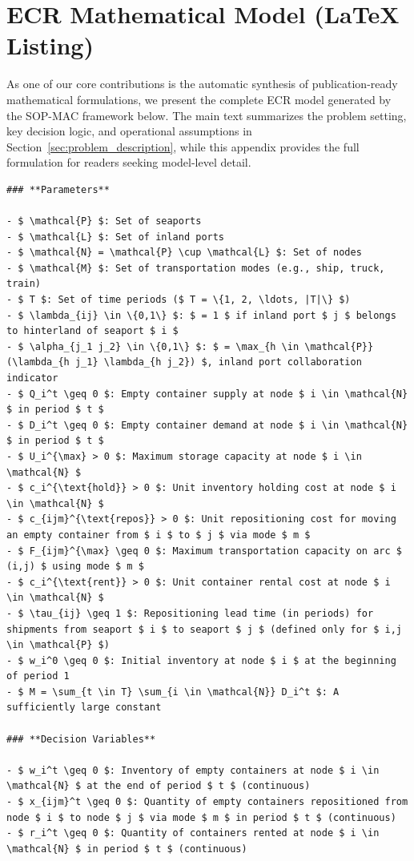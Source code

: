\documentclass[preprint,12pt]{elsarticle}
\begin{document}
\section{ECR Mathematical Model (LaTeX Listing)}\label{app3}
As one of our core contributions is the automatic synthesis of publication-ready mathematical formulations, we present the complete ECR model generated by the SOP-MAC framework below. The main text summarizes the problem setting, key decision logic, and operational assumptions in Section~\ref{sec:problem_description}, while this appendix provides the full formulation for readers seeking model-level detail.
\begin{nolinenumbers}
\begin{promptbox}
\begin{lstlisting}[style=prompttemplate]
### **Parameters**

- $ \mathcal{P} $: Set of seaports
- $ \mathcal{L} $: Set of inland ports
- $ \mathcal{N} = \mathcal{P} \cup \mathcal{L} $: Set of nodes
- $ \mathcal{M} $: Set of transportation modes (e.g., ship, truck, train)
- $ T $: Set of time periods ($ T = \{1, 2, \ldots, |T|\} $)
- $ \lambda_{ij} \in \{0,1\} $: $ = 1 $ if inland port $ j $ belongs to hinterland of seaport $ i $
- $ \alpha_{j_1 j_2} \in \{0,1\} $: $ = \max_{h \in \mathcal{P}} (\lambda_{h j_1} \lambda_{h j_2}) $, inland port collaboration indicator
- $ Q_i^t \geq 0 $: Empty container supply at node $ i \in \mathcal{N} $ in period $ t $
- $ D_i^t \geq 0 $: Empty container demand at node $ i \in \mathcal{N} $ in period $ t $
- $ U_i^{\max} > 0 $: Maximum storage capacity at node $ i \in \mathcal{N} $
- $ c_i^{\text{hold}} > 0 $: Unit inventory holding cost at node $ i \in \mathcal{N} $
- $ c_{ijm}^{\text{repos}} > 0 $: Unit repositioning cost for moving an empty container from $ i $ to $ j $ via mode $ m $
- $ F_{ijm}^{\max} \geq 0 $: Maximum transportation capacity on arc $ (i,j) $ using mode $ m $
- $ c_i^{\text{rent}} > 0 $: Unit container rental cost at node $ i \in \mathcal{N} $
- $ \tau_{ij} \geq 1 $: Repositioning lead time (in periods) for shipments from seaport $ i $ to seaport $ j $ (defined only for $ i,j \in \mathcal{P} $)
- $ w_i^0 \geq 0 $: Initial inventory at node $ i $ at the beginning of period 1
- $ M = \sum_{t \in T} \sum_{i \in \mathcal{N}} D_i^t $: A sufficiently large constant

### **Decision Variables**

- $ w_i^t \geq 0 $: Inventory of empty containers at node $ i \in \mathcal{N} $ at the end of period $ t $ (continuous)
- $ x_{ijm}^t \geq 0 $: Quantity of empty containers repositioned from node $ i $ to node $ j $ via mode $ m $ in period $ t $ (continuous)
- $ r_i^t \geq 0 $: Quantity of containers rented at node $ i \in \mathcal{N} $ in period $ t $ (continuous)


\end{lstlisting}
\end{promptbox}
\end{nolinenumbers}
\end{document}
